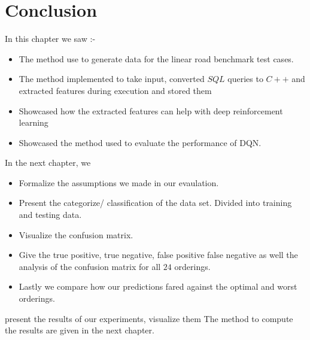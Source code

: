 \section{Conclusion}
In this chapter we saw :- 
\begin{itemize}
    \item The method use to generate data for the linear road benchmark test cases.
    \item The method implemented to take input, converted $SQL$ queries to $C++$ and extracted features during execution and stored them
    \item Showcased how the extracted features can help with deep reinforcement learning
    \item Showcased the method used to evaluate the performance of DQN. 
\end{itemize}
In the next chapter, we
\begin{itemize}
    \item Formalize the assumptions we made in our evaulation.
    \item Present the categorize/ classification of the data set. Divided into training and testing data.
    \item Visualize the confusion matrix.
    \item Give the true positive, true negative, false positive false negative as well the analysis of the confusion matrix for all $24$ orderings.
    \item Lastly we compare how our predictions fared against the optimal and worst orderings. 
\end{itemize} present the results of our experiments, visualize them
 The method to compute the results are given in the next chapter.
